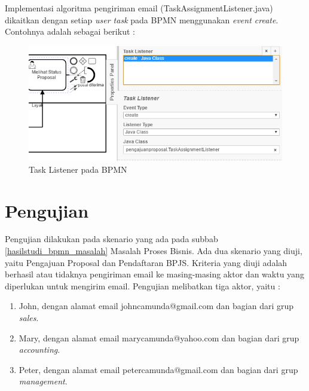 Implementasi algoritma pengiriman email (TaskAssignmentListener.java) dikaitkan dengan setiap \textit{user task} pada BPMN menggunakan \textit{event create}. Contohnya adalah sebagai berikut :
	\begin{figure}[H]
			\centering
			\includegraphics[scale=0.8]{Gambar/Bab-5/taskListener}
			\caption{Task Listener pada BPMN} 
			\label{fig:pengujian_taskListener}
	\end{figure}




\section{Pengujian}
\label{sec:pengujian}
Pengujian dilakukan pada skenario yang ada pada subbab \ref{hasilstudi_bpmn_masalah} Masalah Proses Bisnis. Ada dua skenario yang diuji, yaitu Pengajuan Proposal dan Pendaftaran BPJS. Kriteria yang diuji adalah berhasil atau tidaknya pengiriman email ke masing-masing aktor dan waktu yang diperlukan untuk mengirim email. Pengujian melibatkan tiga aktor, yaitu : 
\begin{enumerate}
	\item John, dengan alamat email johncamunda@gmail.com dan bagian dari grup \textit{sales}.
	\item Mary, dengan alamat email marycamunda@yahoo.com dan bagian dari grup \textit{accounting}.
	\item Peter, dengan alamat email petercamunda@gmail.com dan bagian dari grup \textit{management}.
\end{enumerate}



